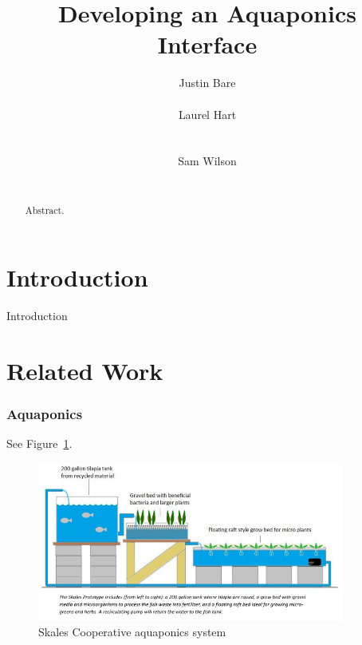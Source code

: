 \documentclass{sigchi}
\begin{document}
\title{Developing an Aquaponics Interface}

\author{
  \alignauthor Justin Bare\\
    \\
  \alignauthor Laurel Hart\\
    \\
    \\
  \alignauthor Sam Wilson\\
    \\
}

\maketitle

\begin{abstract}
Abstract.
\end{abstract}



\section{Introduction}

Introduction

\section{Related Work}
\subsubsection{Aquaponics}
See Figure~\ref{fig:skales}.

\begin{figure}[!h]
\centering
\includegraphics[width=0.9\textwidth]{systemDiagram}
\caption{Skales Cooperative aquaponics system}
\label{fig:skales}
\end{figure}
\end{document}
